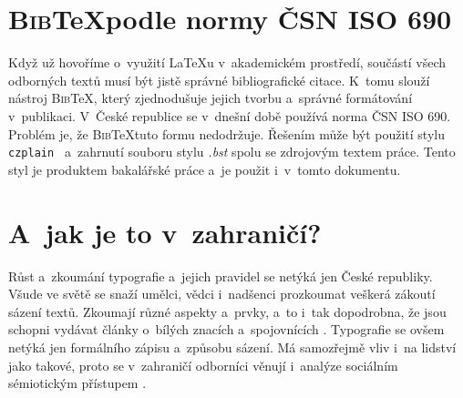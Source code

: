 \documentclass[11pt, a4paper, titlepage]{article}
\newcommand{\textttsp}[1]{\texttt{ #1 }} %
\newcommand{\bibtex}{\textsc{Bib}\negthinspace\TeX} %
\begin{document}
    \section{\bibtex\space podle normy ČSN ISO 690}
    Když už hovoříme o~využití \LaTeX u v~akademickém prostředí, součástí všech odborných textů musí být jistě správné bibliografické citace. K~tomu slouží nástroj \bibtex, který zjednodušuje jejich tvorbu a~správné formátování v~publikaci. V~České republice se v~dnešní době používá norma ČSN ISO 690. Problém je, že \bibtex\space tuto formu nedodržuje. Řešením může být použití stylu \textttsp{czplain} a~zahrnutí souboru stylu {\em *.bst} spolu se zdrojovým textem práce. Tento styl je produktem bakalářské práce \cite{Pysny:BIBTEX_STYL_PRO_CSN_ISO_690_A_CSN_ISO_690_2} a~je použit i~v~tomto dokumentu.
    \section{A~jak je to v~zahraničí?}
    Růst a~zkoumání typografie a~jejich pravidel se netýká jen České republiky. Všude ve světě se snaží umělci, vědci i~nadšenci prozkoumat veškerá zákoutí sázení textů. Zkoumají různé aspekty a~prvky, a~to i~tak dopodrobna, že jsou schopni vydávat články o~bílých znacích a~spojovnících \cite{Janssen:The_Rectangle_in_Typography}. Typografie se ovšem netýká jen formálního zápisu a~způsobu sázení. Má samozřejmě vliv i~na lidství jako takové, proto se v~zahraničí odborníci věnují i~analýze sociálním sémiotickým přístupem \cite{Leeuwen:Towards_a_semiotics_of_typography}.
    
    \newpage
    \renewcommand{\refname}{Literatura}
    
    
\end{document}
